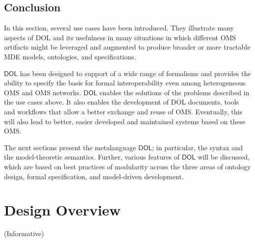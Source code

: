 \documentclass[10pt,fleqn,final]{scrreprt}
\newcommand*{\DOL}{\ensuremath{\mathsf{DOL}}\xspace}
\newcommand{\informative}[0]{{\begin{center}{\Large{(Informative})}\end{center}} \bigskip}
\newcommand{\clauseI}[1]{\chapter{#1} \informative }
\begin{document}
\section{Conclusion}

In this section, several use cases have been introduced. They illustrate many aspects of DOL and its usefulness in many situations in which different OMS artifacts might be leveraged and augmented to produce broader or more tractable MDE models, ontologies, and specifications.

 \DOL has been designed to support of a wide range of formalisms and
provides the ability to specify the basis for formal interoperability even among heterogeneous OMS and OMS networks. \DOL enables the solutions of the problems described in the use cases above. It also enables the development of DOL documents, tools and workflows that 
allow  a better exchange and reuse of OMS. Eventually, this will also lead to better, easier developed and maintained systems based on these OMS.

The next sections present the metalanguage \DOL{}; in particular, the syntax and the model-theoretic semantics. Further, various features of \DOL will be discussed, which  are based on  best practices of modularity  across
 the three areas of ontology design, formal 
specification, and model-driven development.




\clauseI{Design Overview} \label{c:design}
\end{document}
